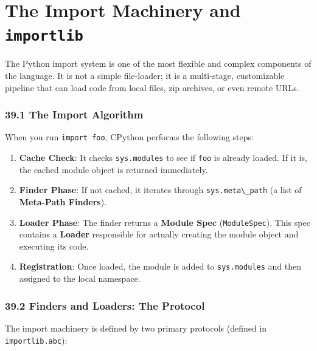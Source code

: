 \hypertarget{the-import-machinery-and-importlib}{%
\chapter{\texorpdfstring{The Import Machinery and
\texttt{importlib}}{The Import Machinery and importlib}}\label{the-import-machinery-and-importlib}}

The Python import system is one of the most flexible and complex
components of the language. It is not a simple file-loader; it is a
multi-stage, customizable pipeline that can load code from local files,
zip archives, or even remote URLs.

\hypertarget{the-import-algorithm}{%
\subsection{39.1 The Import Algorithm}\label{the-import-algorithm}}

When you run \passthrough{\lstinline!import foo!}, CPython performs the
following steps:

\begin{enumerate}
\def\labelenumi{\arabic{enumi}.}
\tightlist
\item
  \textbf{Cache Check}: It checks \passthrough{\lstinline!sys.modules!}
  to see if \passthrough{\lstinline!foo!} is already loaded. If it is,
  the cached module object is returned immediately.
\item
  \textbf{Finder Phase}: If not cached, it iterates through
  \passthrough{\lstinline!sys.meta\_path!} (a list of \textbf{Meta-Path
  Finders}).
\item
  \textbf{Loader Phase}: The finder returns a \textbf{Module Spec}
  (\passthrough{\lstinline!ModuleSpec!}). This spec contains a
  \textbf{Loader} responsible for actually creating the module object
  and executing its code.
\item
  \textbf{Registration}: Once loaded, the module is added to
  \passthrough{\lstinline!sys.modules!} and then assigned to the local
  namespace.
\end{enumerate}

\hypertarget{finders-and-loaders-the-protocol}{%
\subsection{39.2 Finders and Loaders: The
Protocol}\label{finders-and-loaders-the-protocol}}

The import machinery is defined by two primary protocols (defined in
\passthrough{\lstinline!importlib.abc!}):

